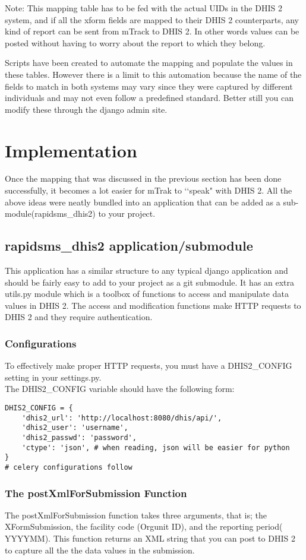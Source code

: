 \documentclass[11pt,a4paper]{article}
\begin{document}
Note: This mapping table has to be fed with the actual UIDs in the DHIS 2 system, and if all the xform fields are mapped to their DHIS 2 counterparts, any kind of report can be sent from mTrack to DHIS 2. In other words values can be posted without having to worry about the report to which they belong.

Scripts have been created to automate the mapping and populate the values in these tables. However there is a limit to this automation because the name of the fields to match in both systems may vary since they were captured by different individuals and may not even follow a predefined standard. Better still you can modify these through the django admin site.
\pagebreak
\section{Implementation}
Once the mapping that was discussed in the previous section has been done successfully, it becomes a lot easier for mTrak to \lq\lq speak" with DHIS 2. All the above ideas were neatly bundled into an application that can be added as a sub-module(rapidsms\_dhis2) to your project.
\subsection{rapidsms\_dhis2 application/submodule}
This application has a similar structure to any typical django application and should be fairly easy to add to your project as a git submodule. It has an extra utils.py module which is a toolbox of functions to access and manipulate data values in DHIS 2. The access and modification functions make HTTP requests to DHIS 2 and they require authentication. 

\subsubsection{Configurations}
To effectively make proper HTTP requests, you must have a DHIS2\_CONFIG  setting in your settings.py.\\
The DHIS2\_CONFIG variable should have the following form:
\begin{verbatim}
DHIS2_CONFIG = {
	'dhis2_url': 'http://localhost:8080/dhis/api/',
    'dhis2_user': 'username',
    'dhis2_passwd': 'password',
    'ctype': 'json', # when reading, json will be easier for python
}
# celery configurations follow
\end{verbatim}

\subsubsection{The postXmlForSubmission Function}
The postXmlForSubmission function takes three arguments, that is; the XFormSubmission, the facility code (Orgunit ID), and the reporting period( YYYYMM). This function returns an XML string that you can post to DHIS 2 to capture all the the data values in the submission.
\end{document}
